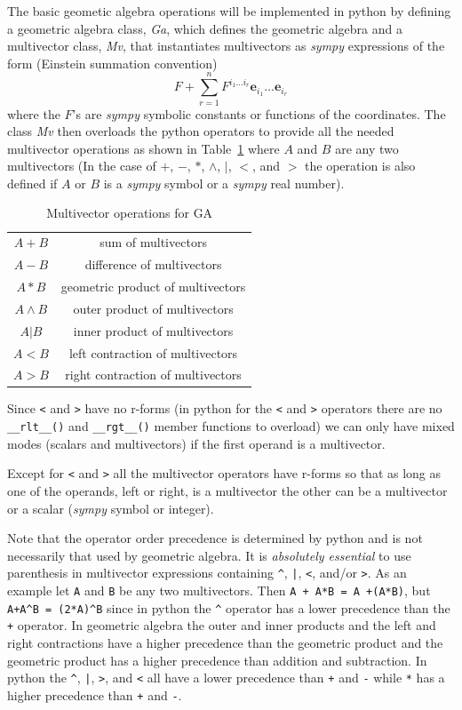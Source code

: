 \documentclass[12pt,twoside,openright]{memoir}
\newcommand{\bm}[1]{\boldsymbol{#1}}
\newcommand{\W}{\wedge}
\newcommand{\be}{\begin{equation}}
\newcommand{\ee}{\end{equation}}
\newcommand{\eb}{\bm{e}}
\newcommand{\T}[1]{\texttt{#1}}
\begin{document}
The basic geometic algebra operations will be implemented in python by defining
a geometric algebra class, {\em Ga}, which defines the geometric algebra and a 
multivector class, {\em Mv}, that instantiates multivectors as \emph{sympy} 
expressions of the form (Einstein summation convention)
\be
   F +\sum_{r=1}^{n}F^{i_{1}\dots i_{r}}\eb_{i_{1}}\dots\eb_{i_{r}}
\ee
where the $F$'s are \emph{sympy} symbolic constants or functions of the 
coordinates. The class {\em Mv} then overloads the python operators to provide
all the needed multivector operations as shown in Table~\ref{ops}
 where $A$ and $B$  are any two multivectors (In the case of
$+$, $-$, $*$, $\W$, $|$, $<$, and $>$ the operation is also defined if $A$ or
$B$ is a \emph{sympy} symbol or a \emph{sympy} real number).
\begin{center}
\begin{table}
\begin{longtable}{cc}
    $A+B$ & sum of multivectors \\
    $A-B$ & difference of multivectors \\
    $A*B$ & geometric product of multivectors \\
    $A\W B$ & outer product of multivectors \\
    $A|B$ & inner product of multivectors \\
    $A<B$ & left contraction of multivectors \\
    $A>B$ & right contraction of multivectors 
\end{longtable}
\caption{Multivector operations for GA}\label{ops}
\end{table}
\end{center}
Since \T{<} and \T{>} have no r-forms (in python for the \T{<} and \T{>} operators there are no \lstinline$__rlt__()$ and
 \lstinline$__rgt__()$ member functions to overload)
we can only have mixed modes (scalars and multivectors) if the first operand is a multivector.

Except for \T{<} and \T{>} all the multivector operators have r-forms so that as long as one of the
operands, left or right, is a multivector the other can be a multivector or a scalar (\emph{sympy} symbol or integer).

Note that the operator order precedence is determined by python and is not
necessarily that used by geometric algebra. It is \emph{absolutely essential} to
use parenthesis in multivector
expressions containing \T{\^}, \T{|}, \T{<}, and/or \T{>}.  As an example let
\T{A} and \T{B} be any two multivectors. Then \T{A + A*B = A +(A*B)}, but
\lstinline!A+A^B = (2*A)^B! since in python the \T{\^} operator has a lower precedence
than the \T{+} operator.  In geometric algebra the outer and inner products and
the left and right contractions have a higher precedence than the geometric
product and the geometric product has a higher precedence than addition and
subtraction.  In python the \T{\^}, \T{|}, \T{>}, and \T{<} all have a lower
precedence than \T{+} and \T{-} while \T{*} has a higher precedence than
\T{+} and \T{-}.
\end{document}
